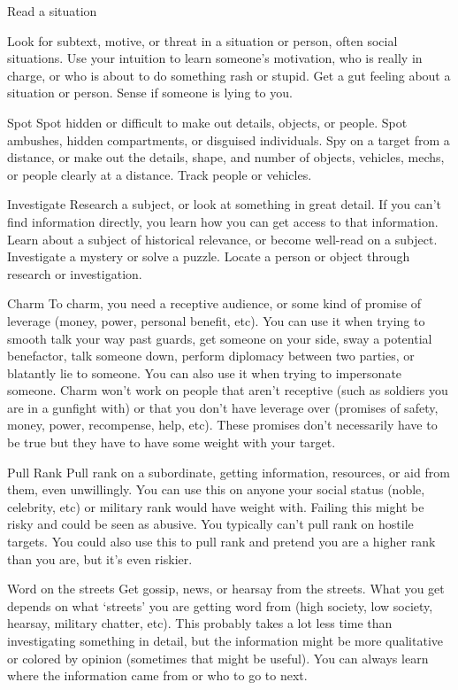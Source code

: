 Read a situation  

                                                                                                                    


Look for subtext, motive, or threat in a situation or person, often social situations. Use your  
intuition to learn someone’s motivation, who is really in charge, or who is about to do something  
rash or stupid. Get a gut feeling about a situation or person. Sense if someone is lying to you.  

Spot  
Spot hidden or difficult to make out details, objects, or people. Spot ambushes, hidden  
compartments, or disguised individuals. Spy on a target from a distance, or make out the details,  
shape, and number of objects, vehicles, mechs, or people clearly at a distance. Track people or  
vehicles.  

Investigate  
Research a subject, or look at something in great detail. If you can’t find information directly, you  
learn how you can get access to that information. Learn about a subject of historical relevance, or  
become well-read on a subject. Investigate a mystery or solve a puzzle. Locate a person or object  
through research or investigation.  

Charm   
To charm, you need a receptive audience, or some kind of promise of leverage (money, power,  
personal benefit, etc). You can use it when trying to smooth talk your way past guards, get  
someone on your side, sway a potential benefactor, talk someone down, perform diplomacy  
between two parties, or blatantly lie to someone. You can also use it when trying to impersonate  
someone. Charm won’t work on people that aren’t receptive (such as soldiers you are in a  
gunfight with) or that you don’t have leverage over (promises of safety, money, power,  
recompense, help, etc). These promises don’t necessarily have to be true but they have to have  
some weight with your target.  

Pull Rank  
Pull rank on a subordinate, getting information, resources, or aid from them, even unwillingly. You  
can use this on anyone your social status (noble, celebrity, etc) or military rank would have weight  
with. Failing this might be risky and could be seen as abusive. You typically can’t pull rank on  
hostile targets. You could also use this to pull rank and pretend you are a higher rank than you  
are, but it’s even riskier.  

Word on the streets  
Get gossip, news, or hearsay from the streets. What you get depends on what ‘streets’ you are  
getting word from (high society, low society, hearsay, military chatter, etc). This probably takes a  
lot less time than investigating something in detail, but the information might be more qualitative  
or colored by opinion (sometimes that might be useful). You can always learn where the  
information came from or who to go to next.  

